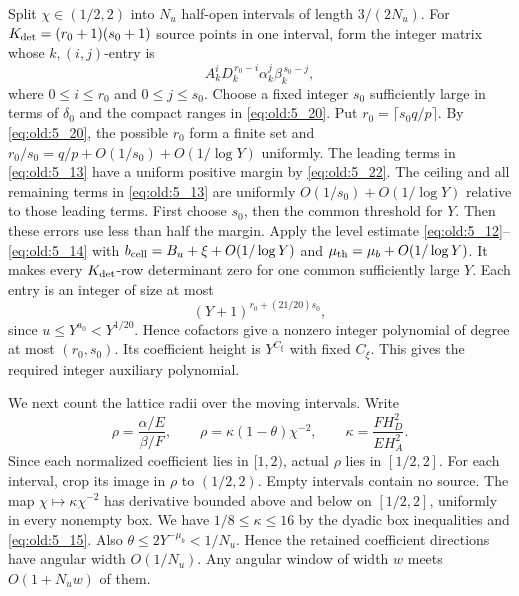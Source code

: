 Split \(\chi\in(1/2,2)\) into \(N_u\) half-open intervals of length
\(3/(2N_u)\). For \(K_{\rm det}=(r_0+1)(s_0+1)\) source points in one interval,
form the integer matrix whose \(k,(i,j)\)-entry is
\[
 A_k^iD_k^{\,r_0-i}\alpha_k^j\beta_k^{\,s_0-j},
\]
where \(0\le i\le r_0\) and \(0\le j\le s_0\). Choose a fixed
integer \(s_0\) sufficiently large in terms of \(\delta_0\) and the
compact ranges in \eqref{eq:old:5_20}. Put \(r_0=\lceil s_0 q/p\rceil\).
By \eqref{eq:old:5_20}, the possible \(r_0\) form a finite set and
\(r_0/s_0=q/p+O(1/s_0)+O(1/\log Y)\) uniformly. The leading terms
in \eqref{eq:old:5_13} have a uniform positive margin by \eqref{eq:old:5_22}. The ceiling and all
remaining terms in \eqref{eq:old:5_13} are uniformly \(O(1/s_0)+O(1/\log Y)\)
relative to those leading terms. First choose \(s_0\), then the common
threshold for \(Y\). Then these errors use less than half the margin.
Apply the level estimate \eqref{eq:old:5_12}--\eqref{eq:old:5_14} with
\(b_{\rm cell}=B_u+\xi+O(1/\log Y)\) and
\(\mu_{\rm th}=\mu_b+O(1/\log Y)\). It makes every
\(K_{\rm det}\)-row determinant zero for one common sufficiently large \(Y\).
Each entry is an integer of size at most
\[
 (Y+1)^{r_0+(21/20)s_0},
\]
since \(u\le Y^{a_0}<Y^{1/20}\). Hence cofactors give a nonzero
integer polynomial of degree at most \((r_0,s_0)\). Its coefficient
height is \(Y^{C_\xi}\) with fixed \(C_\xi\). This gives the required
integer auxiliary polynomial.

We next count the lattice radii over the moving intervals. Write
\[
\rho=\frac{\alpha/E}{\beta/F},\qquad
\rho=\kappa(1-\theta)\chi^{-2},\qquad
\kappa=\frac{F H_D^2}{E H_A^2}.
\]
Since each normalized coefficient lies in \([1,2)\), actual \(\rho\)
lies in \([1/2,2]\). For each interval, crop its image in \(\rho\) to
\((1/2,2)\). Empty intervals contain no source. The map
\(\chi\mapsto\kappa\chi^{-2}\) has derivative bounded above and below on
\([1/2,2]\), uniformly in every nonempty box. We have
\(1/8\le\kappa\le16\) by the dyadic box inequalities and \eqref{eq:old:5_15}.
Also \(\theta\le2Y^{-\mu_b}<1/N_u\). Hence the retained coefficient directions
have angular width \(O(1/N_u)\). Any angular window of width \(w\)
meets \(O(1+N_uw)\) of them.


